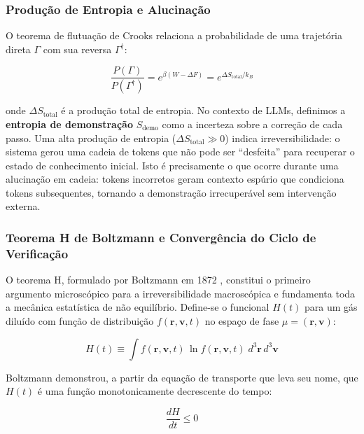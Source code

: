 \documentclass[5p]{elsarticle}
\theoremstyle{remark}
\begin{document}
\subsubsection{Produção de Entropia e Alucinação}

O teorema de flutuação de Crooks \cite{Crooks1999Entropy} relaciona a probabilidade de uma trajetória direta $\Gamma$ com sua reversa $\Gamma^\dagger$:

\begin{equation}
\frac{P(\Gamma)}{P(\Gamma^\dagger)} = e^{\beta (W - \Delta F)} = e^{\Delta S_{\text{total}} / k_B}
\label{eq:crooks}
\end{equation}

onde $\Delta S_{\text{total}}$ é a produção total de entropia. No contexto de LLMs, definimos a \textbf{entropia de demonstração} $S_{\text{demo}}$ como a incerteza sobre a correção de cada passo. Uma alta produção de entropia ($\Delta S_{\text{total}} \gg 0$) indica irreversibilidade: o sistema gerou uma cadeia de tokens que não pode ser ``desfeita'' para recuperar o estado de conhecimento inicial. Isto é precisamente o que ocorre durante uma alucinação em cadeia: tokens incorretos geram contexto espúrio que condiciona tokens subsequentes, tornando a demonstração irrecuperável sem intervenção externa.

\subsubsection{Teorema H de Boltzmann e Convergência do Ciclo de Verificação}

O teorema H, formulado por Boltzmann em 1872 \cite{Boltzmann1872HTheorem, Boltzmann1964Lectures}, constitui o primeiro argumento microscópico para a irreversibilidade macroscópica e fundamenta toda a mecânica estatística de não equilíbrio. Define-se o funcional $H(t)$ para um gás diluído com função de distribuição $f(\mathbf{r}, \mathbf{v}, t)$ no espaço de fase $\mu = (\mathbf{r}, \mathbf{v})$:

\begin{equation}
H(t) \equiv \int f(\mathbf{r}, \mathbf{v}, t) \, \ln f(\mathbf{r}, \mathbf{v}, t) \; d^3\mathbf{r} \, d^3\mathbf{v}
\label{eq:h_def}
\end{equation}

Boltzmann demonstrou, a partir da equação de transporte que leva seu nome, que $H(t)$ é uma função monotonicamente decrescente do tempo:

\begin{equation}
\frac{dH}{dt} \leq 0
\label{eq:h_theorem}
\end{equation}
\end{document}
